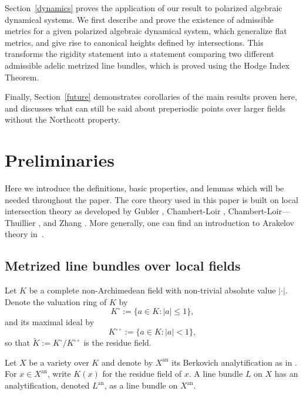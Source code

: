 \documentclass[times, doublespace]{amsart}
\numberwithin{equation}{section}
\theoremstyle{plain}
\theoremstyle{definition}
\DeclareMathOperator{\an}{an}
\begin{document}
Section~\ref{dynamics} proves the application of our result to polarized algebraic dynamical systems. We first describe and prove the existence of admissible metrics for a given polarized algebraic dynamical system, which generalize flat metrics, and give rise to canonical heights defined by intersections. This transforms the rigidity statement into a statement comparing two different admissible adelic metrized line bundles, which is proved using the Hodge Index Theorem.

Finally, Section~\ref{future} demonstrates corollaries of the main results proven here, and discusses what can still be said about preperiodic points over larger fields without the Northcott property.













\section{Preliminaries}\label{defs}

Here we introduce the definitions, basic properties, and lemmas which will be needed throughout the paper. The core theory used in this paper is built on local intersection theory as developed by Gubler \cite{G98,G07b}, Chambert-Loir \cite{C-L}, Chambert-Loir---Thuillier \cite{C-L-T}, and Zhang \cite{Z95}. More generally, one can find an introduction to Arakelov theory in~\cite{moriwakibook,langarakelov,soulelectures}.




\subsection{Metrized line bundles over local fields}\label{adelicsubsection}

Let $K$ be a complete non-Archimedean field with non-trivial absolute value $|\cdot|$. Denote the valuation ring of $K$ by 
\[K^{\circ}:=\{a\in K:|a|\le1\},\]
and its maximal ideal by
\[K^{\circ\circ}:=\{a\in K:|a|<1\},\]
so that $\widetilde K:=K^{\circ}/K^{\circ\circ}$ is the residue field. 

Let $X$ be a variety over $K$ and denote by $X^{\an}$ its Berkovich analytification as in \cite{Berk}. For $x\in X^{\an}$, write $K(x)$ for the residue field of $x$. A line bundle $L$ on $X$ has an analytification, denoted $L^{\an}$, as a line bundle on $X^{\an}$.
\end{document}
